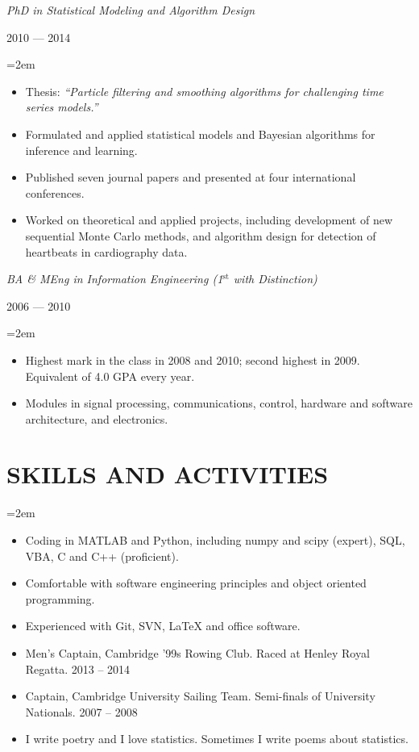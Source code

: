 \documentclass[letterpaper,10pt]{article}
\newcommand{\sepspace}{\vspace*{0.3em}}
\newcommand{\NewPart}[1]{\vspace{-1em} \section*{\uppercase{#1}}}
\newcommand{\SubHeading}[1]{\noindent\textit{#1}}
\newcommand{\DateBox}[1]{\colorbox{light-gray}{\parbox{8em}{\hfill\color{White}#1}}}
\newcommand{\Details}[1]{\hangindent=2em\hangafter=0\small#1\normalsize\par}
\newcommand{\EducationEntry}[3]{%
                \SubHeading{#1} \hfill \DateBox{#2} \par
                \Details{#3} }
\begin{document}
\EducationEntry{PhD in Statistical Modeling and Algorithm Design}{2010 --- 2014}{
\begin{itemize}
 \item Thesis: \textit{``Particle filtering and smoothing algorithms for challenging time series models.''}
 \item Formulated and applied statistical models and Bayesian algorithms for inference and learning.
 \item Published seven journal papers and presented at four international conferences.
 \item Worked on theoretical and applied projects, including development of new sequential Monte Carlo methods, and algorithm design for detection of heartbeats in cardiography data.
\end{itemize}
}
\sepspace

\EducationEntry{BA \& MEng in Information Engineering (1$^{\text{st}}$ with Distinction)}{2006 --- 2010}{
\begin{itemize}
  \item Highest mark in the class in 2008 and 2010; second highest in 2009. Equivalent of 4.0 GPA every year.
  \item Modules in signal processing, communications, control, hardware and software architecture, and electronics.
\end{itemize}
}



\NewPart{Skills and Activities}

\Details{
\begin{itemize}
 \item Coding in MATLAB and Python, including numpy and scipy (expert), SQL, VBA, C and C++ (proficient).
 \item Comfortable with software engineering principles and object oriented programming.
 \item Experienced with Git, SVN, LaTeX and office software.
 \item Men's Captain, Cambridge '99s Rowing Club. Raced at Henley Royal Regatta. 2013 -- 2014
 \item Captain, Cambridge University Sailing Team. Semi-finals of University Nationals. 2007 -- 2008
 \item I write poetry and I love statistics. Sometimes I write poems about statistics.
\end{itemize}
}
\end{document}
